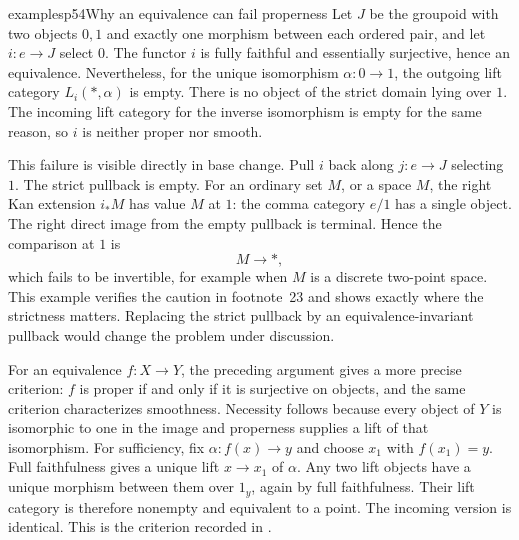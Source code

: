 \begin{dcomment}{examples}{p54}{Why an equivalence can fail properness}
Let $J$ be the groupoid with two objects $0,1$ and exactly one morphism between each ordered pair, and let $i:e\to J$ select $0$. The functor $i$ is fully faithful and essentially surjective, hence an equivalence. Nevertheless, for the unique isomorphism $\alpha:0\to1$, the outgoing lift category $L_i(*,\alpha)$ is empty. There is no object of the strict domain lying over $1$. The incoming lift category for the inverse isomorphism is empty for the same reason, so $i$ is neither proper nor smooth.

This failure is visible directly in base change. Pull $i$ back along $j:e\to J$ selecting $1$. The strict pullback is empty. For an ordinary set $M$, or a space $M$, the right Kan extension $i_*M$ has value $M$ at $1$: the comma category $e/1$ has a single object. The right direct image from the empty pullback is terminal. Hence the comparison at $1$ is
\[
 M\longrightarrow *,
\]
which fails to be invertible, for example when $M$ is a discrete two-point space. This example verifies the caution in footnote~23 and shows exactly where the strictness matters. Replacing the strict pullback by an equivalence-invariant pullback would change the problem under discussion.

For an equivalence $f:X\to Y$, the preceding argument gives a more precise criterion: $f$ is proper if and only if it is surjective on objects, and the same criterion characterizes smoothness. Necessity follows because every object of $Y$ is isomorphic to one in the image and properness supplies a lift of that isomorphism. For sufficiency, fix $\alpha:f(x)\to y$ and choose $x_1$ with $f(x_1)=y$. Full faithfulness gives a unique lift $x\to x_1$ of $\alpha$. Any two lift objects have a unique morphism between them over $1_y$, again by full faithfulness. Their lift category is therefore nonempty and equivalent to a point. The incoming version is identical. This is the criterion recorded in \citet[Remark~3.2.5]{Maltsiniotis2020}.
\end{dcomment}

